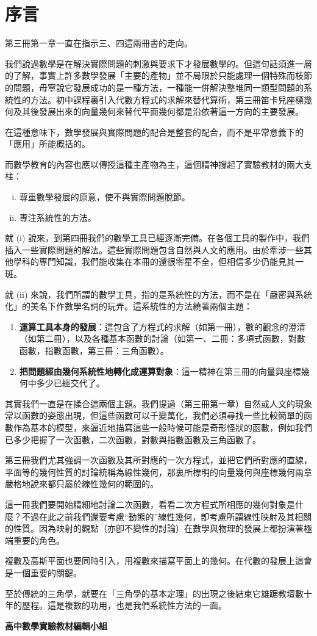 \section*{序\qquad 言}
\label{sec:b4_preface}

第三冊第一章一直在指示三、四這兩冊書的走向。

我們說過數學是在解決實際問題的刺激與要求下才發展數學的。但這句話須進一層的了解，事實上許多數學發展「主要的產物」並不局限於只能處理一個特殊而枝節的問題，毋寧說它發展成功的是一種方法，一種能一併解決整堆同一類型問題的系統性的方法。初中課程裏引入代數方程式的求解來替代算術，第三冊笛卡兒座標幾何及其後發展出來的向量幾何來替代平面幾何都是沿依著這一方向的主要發展。

在這種意味下，數學發展與實際問題的配合是整套的配合，而不是平常意義下的「應用」所能概括的。

而數學教育的內容也應以傳授這種主產物為主，這個精神撐起了實驗教材的兩大支柱：
\begin{enumerate}[(i)]
  \item 尊重數學發展的原意，使不與實際問題脫節。
  \item 專注系統性的方法。
\end{enumerate}

就 (i) 說來，到第四冊我們的數學工具已經逐漸完備。在各個工具的製作中，我們插入一些實際問題的解法。這些實際問題包含自然與人文的應用。由於牽涉一些其他學科的專門知識，我們能收集在本冊的還很零星不全，但相信多少仍能見其一斑。

就 (ii) 來說，我們所謂的數學工具，指的是系統性的方法，而不是在「嚴密與系統化」的美名下作數學名詞的玩弄。這系統性的方法繞著兩個主題：
\begin{enumerate}[(一)]
  \item \textbf{運算工具本身的發展}：這包含了方程式的求解（如第一冊），數的觀念的澄清（如第二冊），以及各種基本函數的討論（如第一、二冊：多項式函數，對數函數，指數函數，第三冊：三角函數）。
  \item \textbf{把問題經由幾何系統性地轉化成運算對象}：這一精神在第三冊的向量與座標幾何中多少已經交代了。
\end{enumerate}

其實我們一直是在揉合這兩個主題。我們提過（第三冊第一章）自然或人文的現象常以函數的姿態出現，但這些函數可以千變萬化，我們必須尋找一些比較簡單的函數作為基本的模型，來逼近地描寫這些一般時候可能是奇形怪狀的函數，例如我們已多少把握了一次函數，二次函數，對數與指數函數及三角函數了。

第三冊我們尤其強調一次函數及其所對應的一次方程式，並把它們所對應的直線，平面等的幾何性質的討論統稱為線性幾何，那裏所標明的向量幾何與座標幾何兩章嚴格地說來都只屬於線性幾何的範圍的。

這一冊我們要開始精細地討論二次函數，看看二次方程式所相應的幾何對象是什麼？不過在此之前我們還要考慮“動態的”線性幾何，卽考慮所謂線性映射及其相關的性質。因為映射的觀點（亦卽不變性的討論）在數學與物理的發展上都扮演著極端重要的角色。

複數及高斯平面也要同時引入，用複數來描寫平面上的幾何。在代數的發展上這會是一個重要的關鍵。

至於傳統的三角學，就要在「三角學的基本定理」的出現之後結束它雄踞教壇數十年的歷程。這是複數的功用，也是我們系統性方法的一面。

\vspace{2em}
\begin{flushright}
\textbf{高中數學實驗教材編輯小組}
\end{flushright}
